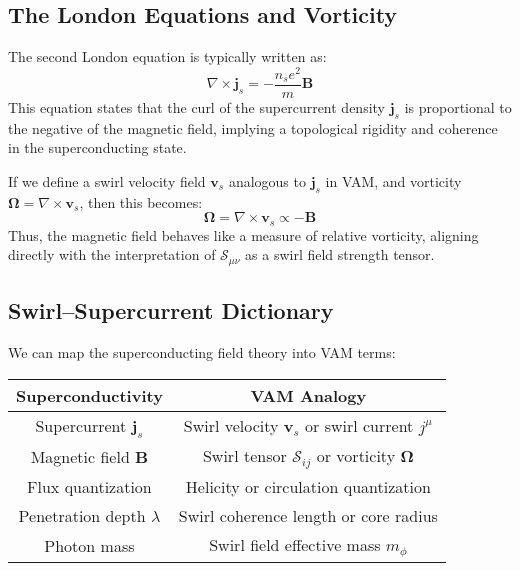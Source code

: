         \subsection*{The London Equations and Vorticity}
        The second London equation is typically written as:
        \begin{equation}
            \nabla \times \mathbf{j}_s = -\frac{n_s e^2}{m} \mathbf{B}
        \end{equation}
        This equation states that the curl of the supercurrent density $\mathbf{j}_s$ is proportional to the negative of the magnetic field, implying a topological rigidity and coherence in the superconducting state.

        If we define a swirl velocity field $\mathbf{v}_s$ analogous to $\mathbf{j}_s$ in VAM, and vorticity $\boldsymbol{\Omega} = \nabla \times \mathbf{v}_s$, then this becomes:
        \begin{equation}
            \boldsymbol{\Omega} = \nabla \times \mathbf{v}_s \propto -\mathbf{B}
        \end{equation}
        Thus, the magnetic field behaves like a measure of relative vorticity, aligning directly with the interpretation of $\mathcal{S}_{\mu\nu}$ as a swirl field strength tensor.

        \subsection{Swirl–Supercurrent Dictionary}
        We can map the superconducting field theory into VAM terms:
        \begin{center}
            \begin{tabular}{|c|c|}
                \hline
                \textbf{Superconductivity} & \textbf{VAM Analogy} \\
                \hline
                Supercurrent $\mathbf{j}_s$ & Swirl velocity $\mathbf{v}_s$ or swirl current $j^\mu$ \\
                Magnetic field $\mathbf{B}$ & Swirl tensor $\mathcal{S}_{ij}$ or vorticity $\boldsymbol{\Omega}$ \\
                Flux quantization & Helicity or circulation quantization \\
                Penetration depth $\lambda$ & Swirl coherence length or core radius \\
                Photon mass & Swirl field effective mass $m_\phi$ \\
                \hline
            \end{tabular}
        \end{center}

